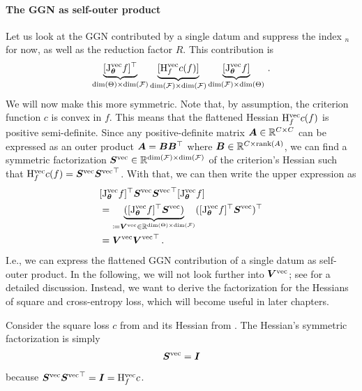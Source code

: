 \paragraph{The GGN as self-outer product}
Let us look at the GGN contributed by a single datum and suppress the index $_n$ for now, as well as the reduction factor $R$.
This contribution is
\begin{align*}
  \underbrace{[\mathrm{J}_{{\bm{\theta}}}^{\operatorname{vec}} f]^{\top}}_{\dim(\Theta) \times \dim({\mathcal{F}})}
  \underbrace{[\mathrm{H}^{\operatorname{vec}}_{f} c(f)]}_{\dim({\mathcal{F}}) \times \dim({\mathcal{F}})}
  \underbrace{[\mathrm{J}_{{\bm{\theta}}}^{\operatorname{vec}} f]}_{\dim({\mathcal{F}}) \times \dim(\Theta)}\,.
\end{align*}
We will now make this more symmetric.
Note that, by assumption, the criterion function $c$ is convex in $f$.
This means that the flattened Hessian $\mathrm{H}^{\operatorname{vec}}_{f} c(f)$ is positive semi-definite.
Since any positive-definite matrix ${\bm{A}} \in {\mathbb{R}}^{C \times C}$ can be expressed as an outer product ${\bm{A}} = {\bm{B}} {\bm{B}}^{\top}$ where ${\bm{B}} \in {\mathbb{R}}^{C \times \operatorname{rank}(A)}$, we can find a symmetric factorization ${\bm{S}}^{\operatorname{vec}} \in {\mathbb{R}}^{\dim({\mathcal{F}}) \times \dim({\mathcal{F}})}$ of the criterion's Hessian such that $\mathrm{H}^{\operatorname{vec}}_{f} c(f) = {\bm{S}}^{\operatorname{vec}} {{\bm{S}}^{\operatorname{vec}}}^{\top}$.
With that, we can then write the upper expression as
\begin{align*}
  &[\mathrm{J}_{{\bm{\theta}}}^{\operatorname{vec}} f]^{\top} {\bm{S}}^{\operatorname{vec}} {{\bm{S}}^{\operatorname{vec}}}^{\top} [\mathrm{J}_{{\bm{\theta}}}^{\operatorname{vec}} f]
  \\
  &=
  \underbrace{([\mathrm{J}_{{\bm{\theta}}}^{\operatorname{vec}} f]^{\top} {\bm{S}}^{\operatorname{vec}})}_{\coloneq {\bm{V}}^{\operatorname{vec}} \in {\mathbb{R}}^{\dim(\Theta) \times \dim({\mathcal{F}})}}
  ([\mathrm{J}_{{\bm{\theta}}}^{\operatorname{vec}} f]^{\top} {\bm{S}}^{\operatorname{vec}})^{\top}
  \\
  &=
  {\bm{V}}^{\operatorname{vec}} {{\bm{V}}^{\operatorname{vec}}}^{\top}\,.
\end{align*}
I.e., we can express the flattened GGN contribution of a single datum as self-outer product.
In the following, we will not look further into ${\bm{V}}^{\operatorname{vec}}$; see \cite{dangel2022vivit,papyan2019measurements} for a detailed discussion. Instead, we want to derive the factorization for the Hessians of square and cross-entropy loss, which will become useful in later chapters.
\begin{example}\label{ex:mseloss_hessian_factorization}
  Consider the square loss $c$ from  and its Hessian from .
  The Hessian's symmetric factorization is simply
  \begin{align*}
    {\bm{S}}^{\operatorname{vec}} = {\bm{I}}
  \end{align*}
  because ${\bm{S}}^{\operatorname{vec}} {{\bm{S}}^{\operatorname{vec}}}^{\top} = {\bm{I}} = \mathrm{H}_{f}^{\operatorname{vec}}c$.
\end{example}

